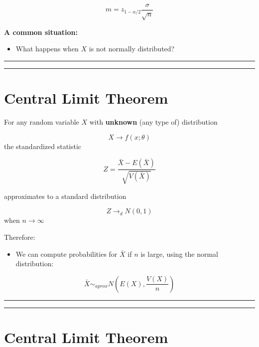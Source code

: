 \documentclass[
]{book}
\providecommand{\tightlist}{%
  \setlength{\itemsep}{0pt}\setlength{\parskip}{0pt}}
\begin{document}
\[m=z_{1-\alpha/2}\frac{\sigma}{\sqrt{n}}\]

\textbf{A common situation:}

\begin{itemize}
\tightlist
\item
  What happens when \(X\) is not normally distributed?
\end{itemize}

\begin{center}\rule{0.5\linewidth}{0.5pt}\end{center}

\begin{center}\rule{0.5\linewidth}{0.5pt}\end{center}

\hypertarget{central-limit-theorem-1}{%
\section{Central Limit Theorem}\label{central-limit-theorem-1}}

For any random variable \(X\) with \textbf{unknown} (any type of) distribution

\[X \rightarrow f(x; \theta)\]
the standardized statistic

\[Z=\frac{\bar{X}-E(\bar{X})}{\sqrt{V(\bar{X})}}\]

approximates to a standard distribution

\[Z \rightarrow_d N(0,1)\] when \(n\rightarrow \infty\)

Therefore:

\begin{itemize}
\tightlist
\item
  We can compute probabilities for \(\bar{X}\) if \(n\) is large, using the normal distribution:
\end{itemize}

\[\bar{X} \sim_{aprox}  N(E(X), \frac{V(X)}{n})\]

\begin{center}\rule{0.5\linewidth}{0.5pt}\end{center}

\begin{center}\rule{0.5\linewidth}{0.5pt}\end{center}

\hypertarget{central-limit-theorem-2}{%
\section{Central Limit Theorem}\label{central-limit-theorem-2}}
\end{document}
